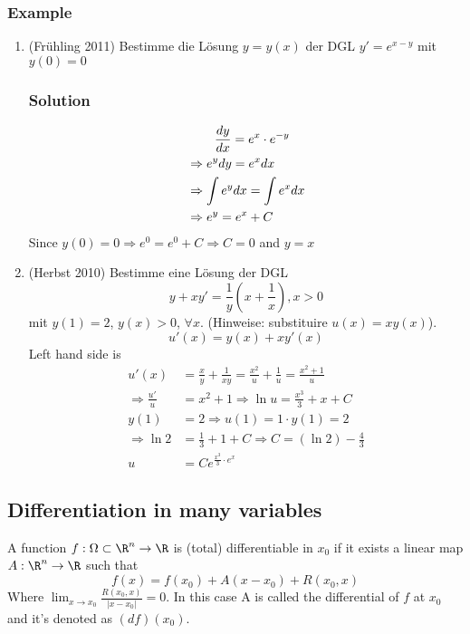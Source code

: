 \documentclass[a4paper]{article}
\begin{document}
\subsubsection*{Example}
\begin{enumerate}
\item (Frühling 2011) Bestimme die Lösung $y=y(x)$ der DGL $y'=e^{x-y}$ mit $y(0)=0$
\subsubsection*{Solution}
\begin{align*}
&\hspace{7.7mm}\frac{dy}{dx}=e^x\cdot e^{-y}\\
&\Rightarrow e^y dy = e^x dx\\
&\Rightarrow \int e^y dx = \int e^x dx\\
&\Rightarrow e^y=e^x+C
\end{align*}
Since $y(0)=0\Rightarrow e^0 = e^0 + C\Rightarrow C=0$ and $y=x$
\item (Herbst 2010) Bestimme eine Lösung der DGL 
\[y+xy' = \frac{1}{y}\left( x+\frac{1}{x}\right), x>0\]
mit $y(1)=2$, $y(x)>0$, $\forall x$. (Hinweise: substituire $u(x)=xy(x)$).
\[u'(x)=y(x)+xy'(x)\]
Left hand side is
\begin{align*}
u'(x) &= \frac{x}{y}+\frac{1}{xy}=\frac{x^2}{u}+\frac{1}{u}=\frac{x^2+1}{u}\\
\Rightarrow \frac{u'}{u} &=x^2+1\Rightarrow \ln u = \frac{x^3}{3}+x+C\\
y(1)&=2 \Rightarrow u(1)=1\cdot y(1)=2\\
\Rightarrow \ln 2 &= \frac{1}{3}+1+C \Rightarrow C=(\ln 2)-\frac{4}{3}\\
u&=Ce^{\frac{x^3}{3}\cdot e^x}
\end{align*}
\end{enumerate}






\subsection{Differentiation in many variables}
A function $f:\Omega \subset \R^n \rightarrow \R$ is (total) differentiable in $x_0$ if it exists a linear map $A:\R^n \rightarrow \R$ such that $$f(x)=f(x_0)+A(x-x_0)+R(x_0,x)$$
Where $\lim_{x\rightarrow x_0} \frac{R(x_0,x)}{|x-x_0|}=0$.
In this case A is called the differential of $f$ at $x_0$ and it's denoted as $(df)(x_0)$.
\end{document}
